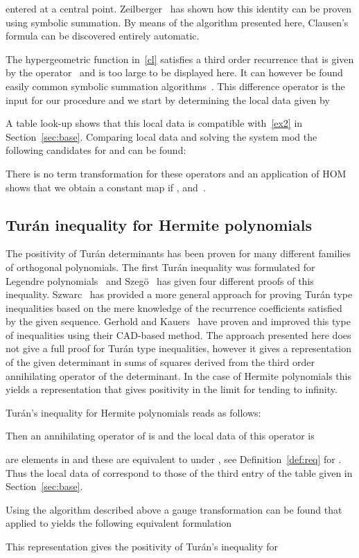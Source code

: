 \documentclass{article}
\begin{document}
entered at a central point. Zeilberger~\cite{SBE93} has shown how this identity can be
proven using symbolic summation. By means of the algorithm presented here, Clausen's formula
can be discovered entirely automatic.

The hypergeometric function in~\eqref{cl} satisfies a third order recurrence that is given 
by the operator~ and is too large to be displayed here. It can however be found easily
common symbolic summation algorithms~\cite{Zeil90a, ChyzakDM, KoutschHF}. This difference operator
is the input for our procedure and we start by determining the local data given by

A table look-up shows that this local data is compatible with~\ref{ex2} in Section~\ref{sec:base}. Comparing local data and solving the system mod  
the following candidates for  and  can be found:

There is no term transformation for these operators and an application of HOM shows that we obtain a constant map if ,  and~.

\noindent 



\subsection{Tur\'{a}n inequality for Hermite polynomials}
\label{turan}
The positivity of Tur\'{a}n determinants has been proven for many different families of
orthogonal polynomials. The first Tur\'{a}n inequality was formulated for Legendre
polynomials~\cite{TP50} and Szeg\"o~\cite{SG48} has given four different proofs of this
inequality.  Szwarc~\cite{Szwarc} has provided a more general approach for proving
Tur\'{a}n type inequalities based on the mere knowledge of the recurrence coefficients
satisfied by the given sequence. Gerhold and Kauers~\cite{MKTuran} have proven and
improved this type of inequalities using their CAD-based method. The approach presented
here does not give a full proof for Tur\'{a}n type inequalities, however it gives a
representation of the given determinant in sums of squares derived from the third order
annihilating operator of the determinant. In the case of Hermite polynomials this yields a
representation that gives positivity in the limit for  tending to infinity.

Tur\'{a}n's inequality for Hermite polynomials  reads as follows:

Then an annihilating operator of 
is  and the local
data of this operator is



 are elements in  and
these are equivalent to  under , see Definition~\ref{def:req} for . 
Thus the local data of  correspond to those of the third entry of the table given in Section~\ref{sec:base}.


Using the algorithm described above a gauge transformation can be found that applied to 
 yields the following equivalent formulation

This representation gives the positivity of Tur\'{a}n's inequality for





\end{document}
